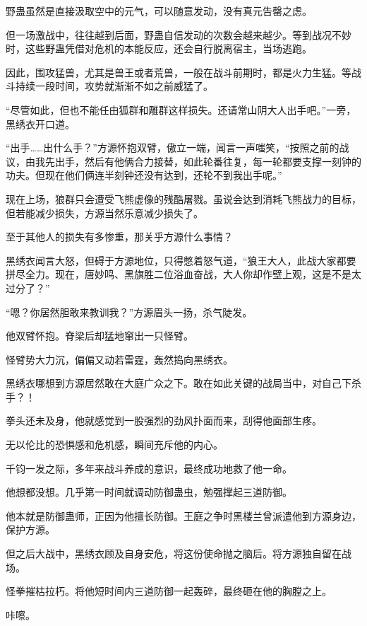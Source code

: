 
\begin{this_body}

野蛊虽然是直接汲取空中的元气，可以随意发动，没有真元告罄之虑。

但一场激战中，往往越到后面，野蛊自信发动的次数会越来越少。等到战况不妙时，这些野蛊凭借对危机的本能反应，还会自行脱离宿主，当场逃跑。

因此，围攻猛兽，尤其是兽王或者荒兽，一般在战斗前期时，都是火力生猛。等战斗持续一段时间，攻势就渐渐不如之前威猛了。

“尽管如此，但也不能任由狐群和雕群这样损失。还请常山阴大人出手吧。”一旁，黑绣衣开口道。

“出手……出什么手？”方源怀抱双臂，傲立一端，闻言一声嗤笑，“按照之前的战议，由我先出手，然后有他俩合力接替，如此轮番往复，每一轮都要支撑一刻钟的功夫。但现在他们俩连半刻钟还没有达到，还轮不到我出手呢。”

现在上场，狼群只会遭受飞熊虚像的残酷屠戮。虽说会达到消耗飞熊战力的目标，但若能减少损失，方源当然乐意减少损失了。

至于其他人的损失有多惨重，那关乎方源什么事情？

黑绣衣闻言大怒，但碍于方源地位，只得憋着怒气道，“狼王大人，此战大家都要拼尽全力。现在，唐妙鸣、黑旗胜二位浴血奋战，大人你却作壁上观，这是不是太过分了？”

“嗯？你居然胆敢来教训我？”方源眉头一扬，杀气陡发。

他双臂怀抱。脊梁后却猛地窜出一只怪臂。

怪臂势大力沉，偏偏又动若雷霆，轰然捣向黑绣衣。

黑绣衣哪想到方源居然敢在大庭广众之下。敢在如此关键的战局当中，对自己下杀手？！

拳头还未及身，他就感觉到一股强烈的劲风扑面而来，刮得他面部生疼。

无以伦比的恐惧感和危机感，瞬间充斥他的内心。

千钧一发之际，多年来战斗养成的意识，最终成功地救了他一命。

他想都没想。几乎第一时间就调动防御蛊虫，勉强撑起三道防御。

他本就是防御蛊师，正因为他擅长防御。王庭之争时黑楼兰曾派遣他到方源身边，保护方源。

但之后大战中，黑绣衣顾及自身安危，将这份使命抛之脑后。将方源独自留在战场。

怪拳摧枯拉朽。将他短时间内三道防御一起轰碎，最终砸在他的胸膛之上。

咔嚓。


\end{this_body}

